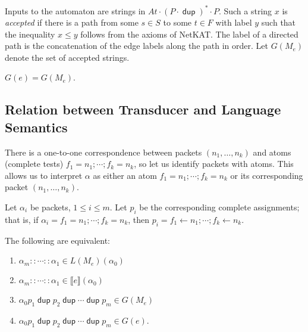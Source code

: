 \documentclass{article}
\newcommand\den[1]{\llbracket #1\rrbracket}
\newcommand\At{\ensuremath{\mathit{At}}}
\newcommand\pdup{\mathop{\mathsf{dup}}}
\renewcommand\star{^{\textstyle *}}
\begin{document}
Inputs to the automaton are strings in $\At\cdot(P\cdot\pdup)\star\cdot P$. Such a string $x$ is \emph{accepted} if there is a path from some $s\in S$ to some $t\in F$ with label $y$ such that the inequality $x\leq y$ follows from the axioms of NetKAT. The label of a directed path is the concatenation of the edge labels along the path in order. Let $G(M_e)$ denote the set of accepted strings.

\begin{theorem}
$G(e) = G(M_e)$.
\end{theorem}

\subsection*{Relation between Transducer and Language Semantics}

There is a one-to-one correspondence between packets $(n_1,\ldots,n_k)$ and atoms (complete tests) $f_1=n_1;\cdots;f_k=n_k$, so let us identify packets with atoms. This allows us to interpret $\alpha$ as either an atom $f_1=n_1;\cdots;f_k=n_k$ or its corresponding packet $(n_1,\ldots,n_k)$.

Let $\alpha_i$ be packets, $1\leq i\leq m$.
Let $p_i$ be the corresponding complete assignments; that is, if
$\alpha_i = f_1=n_1;\cdots;f_k=n_k$, then
$p_i = f_1\leftarrow n_1;\cdots;f_k\leftarrow n_k$.

\begin{theorem}
The following are equivalent:
\begin{enumerate}
\romanize
\item
$\alpha_m::\cdots::\alpha_1 \in L(M_e)(\alpha_0)$
\item
$\alpha_m::\cdots::\alpha_1 \in \den{e}(\alpha_0)$
\item
$\alpha_0 p_1 \pdup p_2 \pdup \cdots \pdup p_m \in G(M_e)$
\item
$\alpha_0 p_1 \pdup p_2 \pdup \cdots \pdup p_m \in G(e)$.
\end{enumerate}
\end{theorem}
\end{document}
